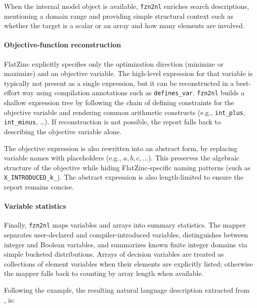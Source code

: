 \documentclass[../../main]{subfiles}
\begin{document}
When the internal model object is available, \texttt{fzn2nl} enriches search descriptions, mentioning a domain range and providing simple structural context such as whether the target is a scalar or an array and how many elements are involved.

\paragraph{Objective-function reconstruction}
FlatZinc explicitly specifies only the optimization direction (minimize or maximize) and an objective variable. The high-level expression for that variable is typically not present as a single expression, but it can be reconstructed in a best-effort way using compilation annotations such as \texttt{defines\_var}. \texttt{fzn2nl} builds a shallow expression tree by following the chain of defining constraints for the objective variable and rendering common arithmetic constructs (e.g., \texttt{int\_plus}, \texttt{int\_minus}, \dots). If reconstruction is not possible, the report falls back to describing the objective variable alone.

The objective expression is also rewritten into an abstract form, by replacing variable names with placeholders (e.g., $a,b,c,\dots$). This preserves the algebraic structure of the objective while hiding FlatZinc-specific naming patterns (such as \texttt{X\_INTRODUCED\_k\_}). The abstract expression is also length-limited to ensure the report remains concise.

\paragraph{Variable statistics}
Finally, \texttt{fzn2nl} maps variables and arrays into summary statistics. The mapper separates user-declared and compiler-introduced variables, distinguishes between integer and Boolean variables, and summarizes known finite integer domains via simple bucketed distributions. Arrays of decision variables are treated as collections of element variables when their elements are explicitly listed; otherwise the mapper falls back to counting by array length when available.

Following the example, the resulting natural language description extracted from , is:
\end{document}
